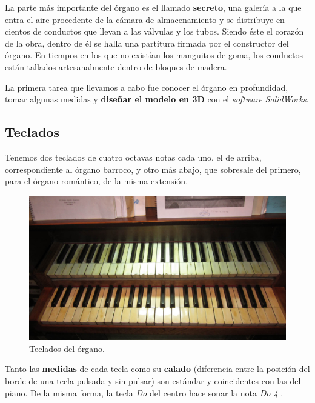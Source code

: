 \smallskip

La parte más importante del órgano es el llamado \textbf{secreto}, una galería a la que entra el aire procedente de la cámara de almacenamiento y se distribuye en cientos de conductos que llevan a las válvulas y los tubos. Siendo éste el corazón de la obra, dentro de él se halla una partitura firmada por el constructor del órgano. En tiempos en los que no existían los manguitos de goma, los conductos están tallados artesanalmente dentro de bloques de madera.

La primera tarea que llevamos a cabo fue conocer el órgano en profundidad, tomar algunas medidas y \textbf{diseñar el modelo en 3D} con el \textit{software} \textit{SolidWorks}.

\subsection{Teclados}

Tenemos dos teclados de cuatro octavas notas cada uno, el de arriba, correspondiente al órgano barroco, y otro más abajo, que sobresale del primero, para el órgano romántico, de la misma extensión.

\smallskip

\begin{figure}[H]
	\noindent \begin{centering}
		\includegraphics[width=\linewidth*3/4]{capitulo3/teclados}
		\par\end{centering}
	\smallskip
	\caption{\label{fig:teclados} Teclados del órgano.}
\end{figure} 

\smallskip

Tanto las \textbf{medidas} de cada tecla como su \textbf{calado} (diferencia entre la posición del borde de una tecla pulsada y sin pulsar) son estándar y coincidentes con las del piano. De la misma forma, la tecla \textit{Do} del centro hace sonar la nota \textit{Do 4} \footnotemark.

